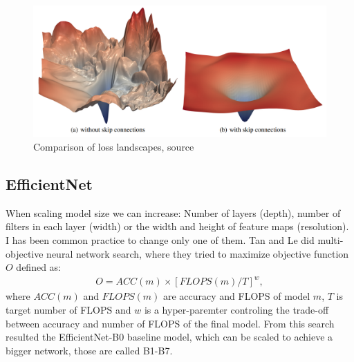 \begin{figure}
    \centering
    \includegraphics[width=\linewidth]{images/resnet_loss.png}
    \caption{Comparison of loss landscapes, source \cite{Li2017}}
    \label{fig:resnet_loss}
\end{figure}

\subsection{EfficientNet}
When scaling model size we can increase: Number of layers (depth), number of filters in each layer (width) or the width and height of feature maps (resolution). I has been common practice to change only one of them. Tan and Le \cite{Tan2019a} did multi-objective neural network search, where they tried to maximize objective function $O$ defined as:
\begin{align}
    O = ACC \left( m \right) \times \left[ FLOPS \left(m \right) / T \right] ^w,
\end{align}
where $ACC(m)$ and $FLOPS(m)$ are accuracy and FLOPS of model $m$, $T$ is target number of FLOPS and $w$ is a hyper-paremter controling the trade-off between accuracy and number of FLOPS of the final model. From this search resulted the EfficientNet-B0 baseline model, which can be scaled to achieve a bigger network, those are called B1-B7.

